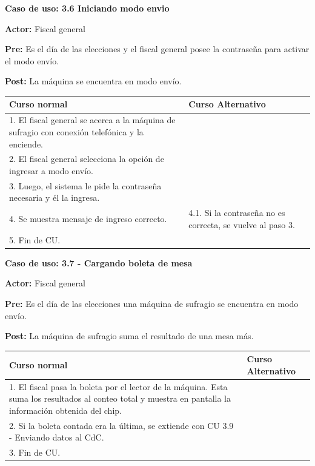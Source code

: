 \textbf{Caso de uso: 3.6 Iniciando modo envio}

\textbf{Actor:} Fiscal general

\textbf{Pre:} Es el día de las elecciones y el fiscal general posee la contraseña para activar el modo envío.

\textbf{Post:} La máquina se encuentra en modo envío.

\begin{table}[h!]
	
 \begin{tabular}{|p{7.5cm} | p{7.5cm}|} 
 \hline
 \textbf{Curso normal} & \textbf{Curso Alternativo} \\
 \hline

1. El fiscal general se acerca a la máquina de sufragio con conexión telefónica y la enciende. & \\
\hline

2. El fiscal general selecciona la opción de ingresar a modo envío. & \\
\hline

3. Luego, el sistema le pide la contraseña necesaria y él la ingresa. & \\
\hline

4. Se muestra mensaje de ingreso correcto. &
4.1. Si la contraseña no es correcta, se vuelve al paso 3. \\
\hline
5. Fin de CU. \\

\end{tabular}
\end{table}


\textbf{Caso de uso: 3.7 - Cargando boleta de mesa}

\textbf{Actor:} Fiscal general

\textbf{Pre:} Es el día de las elecciones una máquina de sufragio se encuentra en modo envío.

\textbf{Post:} La máquina de sufragio suma el resultado de una mesa más.

\begin{table}[h!]
	
 \begin{tabular}{|p{7.5cm} | p{7.5cm}|} 
 \hline
 \textbf{Curso normal} & \textbf{Curso Alternativo} \\
 \hline

1. El fiscal pasa la boleta por el lector de la máquina. Esta suma los resultados al conteo total y muestra en pantalla la información obtenida del chip. & \\
\hline

2. Si la boleta contada era la última, se extiende con CU 3.9 - Enviando datos al CdC. & \\
\hline

3. Fin de CU. & \\
\hline
\end{tabular}
\end{table}

